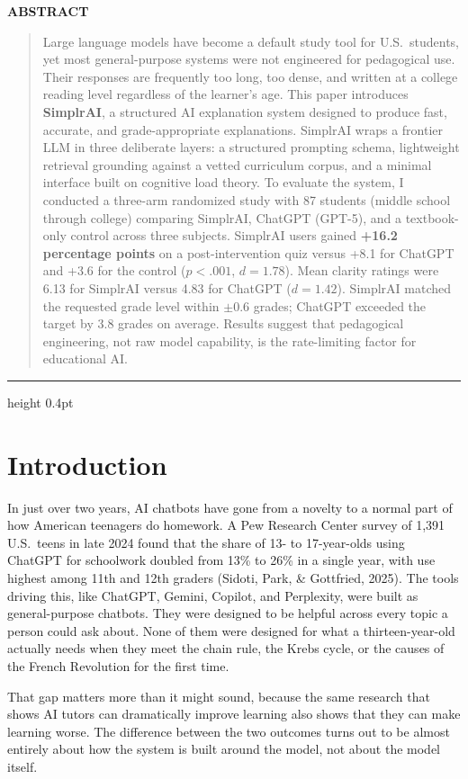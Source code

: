 \documentclass[11pt,letterpaper]{article}
\renewenvironment{abstract}{%
  \begin{center}\sffamily\bfseries\color{accent}\normalsize ABSTRACT\end{center}
  \vspace{-0.4em}
  \begin{quote}\small\itshape\noindent\ignorespaces
}{%
  \end{quote}\vspace{0.4em}\hrule height 0.4pt\vspace{0.6em}
}
\begin{document}
\begin{abstract}
Large language models have become a default study tool for U.S.\ students, yet
most general-purpose systems were not engineered for pedagogical use. Their
responses are frequently too long, too dense, and written at a college reading
level regardless of the learner's age. This paper introduces \textbf{SimplrAI},
a structured AI explanation system designed to produce fast, accurate, and
grade-appropriate explanations. SimplrAI wraps a frontier LLM in three deliberate
layers: a structured prompting schema, lightweight retrieval grounding against a
vetted curriculum corpus, and a minimal interface built on cognitive load theory.
To evaluate the system, I conducted a three-arm randomized study with 87
students (middle school through college) comparing SimplrAI, ChatGPT (GPT-5),
and a textbook-only control across three subjects. SimplrAI users gained
\textbf{+16.2 percentage points} on a post-intervention quiz versus +8.1 for
ChatGPT and +3.6 for the control ($p < .001$, $d = 1.78$). Mean clarity ratings
were 6.13 for SimplrAI versus 4.83 for ChatGPT ($d = 1.42$). SimplrAI matched
the requested grade level within $\pm 0.6$ grades; ChatGPT exceeded the target
by 3.8 grades on average. Results suggest that pedagogical engineering, not raw
model capability, is the rate-limiting factor for educational AI.
\end{abstract}


\section{Introduction}

In just over two years, AI chatbots have gone from a novelty to a normal part
of how American teenagers do homework. A Pew Research Center survey of 1,391
U.S.\ teens in late 2024 found that the share of 13- to 17-year-olds using
ChatGPT for schoolwork doubled from 13\% to 26\% in a single year, with use
highest among 11th and 12th graders (Sidoti, Park, \& Gottfried, 2025). The
tools driving this, like ChatGPT, Gemini, Copilot, and Perplexity, were built
as general-purpose chatbots. They were designed to be helpful across every topic
a person could ask about. None of them were designed for what a thirteen-year-old
actually needs when they meet the chain rule, the Krebs cycle, or the causes of
the French Revolution for the first time.

That gap matters more than it might sound, because the same research that shows
AI tutors can dramatically improve learning also shows that they can make
learning worse. The difference between the two outcomes turns out to be almost
entirely about how the system is built around the model, not about the model
itself.
\end{document}
